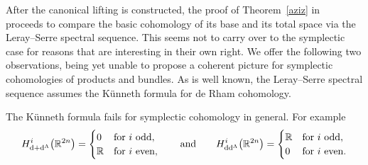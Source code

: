\documentclass[pdftex]{sigma}
\numberwithin{equation}{section}
\begin{document}
After the canonical lifting is constructed, the proof of Theorem~\ref{aziz} in~\cite{aziztopologiczny} proceeds to compare the basic cohomology of its base and its total space via the Leray--Serre spectral sequence. This seems not to carry over to the symplectic case for reasons that are interesting in their own right. We offer the following two observations, being yet unable to propose a coherent picture for symplectic cohomologies of products and bundles. As is well known, the Leray--Serre spectral sequence assumes the K\"{u}nneth formula for de Rham cohomology.
\begin{Example}\label{disc}
The K\"unneth formula fails for symplectic cohomology in general. For example
\begin{gather*}
H^{i}_{{\rm d}+{\rm d}^{\Lambda}}\big(\mathbb{R}^{2n}\big)=\begin{cases}0 & \text{for $i$ odd}, \\ \mathbb{R} & \text{for $i$ even}, \end{cases}
\qquad \text{and}\qquad
H^{i}_{{\rm d}{\rm d}^{\Lambda}}\big(\mathbb{R}^{2n}\big)=\begin{cases}\mathbb{R} & \text{for $i$ odd}, \\ 0 & \text{for $i$ even}. \end{cases}
\end{gather*}
\end{Example}
\end{document}
